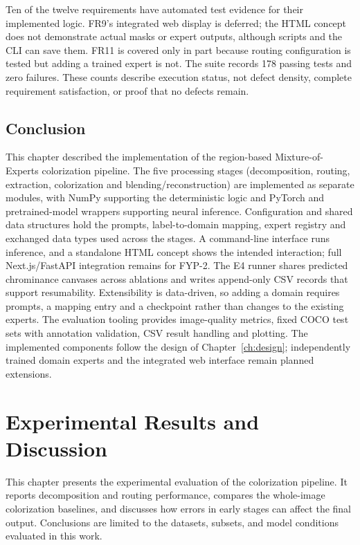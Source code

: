 \documentclass{FastFyp}
\begin{document}
Ten of the twelve requirements have automated test evidence for their implemented logic. FR9's integrated web display is deferred; the HTML concept does not demonstrate actual masks or expert outputs, although scripts and the CLI can save them. FR11 is covered only in part because routing configuration is tested but adding a trained expert is not. The suite records 178 passing tests and zero failures. These counts describe execution status, not defect density, complete requirement satisfaction, or proof that no defects remain.
\fi

\section{Conclusion}
This chapter described the implementation of the region-based Mixture-of-Experts
colorization pipeline. The five processing stages (decomposition, routing,
extraction, colorization and blending/reconstruction) are implemented as
separate modules, with NumPy supporting the deterministic logic and PyTorch
and pretrained-model wrappers supporting neural inference. Configuration and
shared data structures hold the prompts, label-to-domain mapping, expert
registry and exchanged data types used across the stages. A command-line
interface runs inference, and a standalone HTML concept shows the intended
interaction; full Next.js/FastAPI integration remains for FYP-2. The E4 runner
shares predicted chrominance canvases across ablations and writes append-only
CSV records that support resumability. Extensibility is data-driven, so adding
a domain requires prompts, a mapping entry and a checkpoint rather than changes
to the existing experts. The evaluation tooling provides image-quality metrics,
fixed COCO test sets with annotation validation, CSV result handling and
plotting. The implemented components follow the design of Chapter~\ref{ch:design};
independently trained domain experts and the integrated web interface remain
planned extensions.

\chapter{Experimental Results and Discussion}
\label{ch:results}
This chapter presents the experimental evaluation of the colorization
pipeline. It reports decomposition and routing performance, compares the
whole-image colorization baselines, and discusses how errors in early stages
can affect the final output. Conclusions are limited to the datasets,
subsets, and model conditions evaluated in this work.
\end{document}
